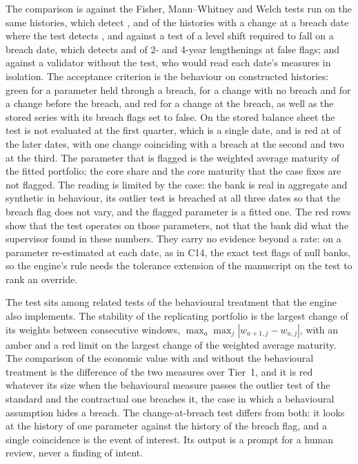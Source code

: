 The comparison is against the Fisher, Mann--Whitney and Welch tests run on the same histories, which detect \pxPpEightFisher{}, \pxPpEightMw{} and \pxPpEightWelch{} of the histories with a change at a breach date where the test detects \pxPpEightStatedAlt{}, and against a test of a level shift required to fall on a breach date, which detects \pxPpEightBreakTwo{} and \pxPpEightBreakFour{} of 2- and 4-year lengthenings at \pxPpEightBreakNull{} false flags; and against a validator without the test, who would read each date's measures in isolation. The acceptance criterion is the behaviour on constructed histories:
green for a parameter held through a breach, for a change with no breach and for a change before the breach, and red for a change at the breach, as well as the stored series with its breach flags set to false.
On the stored balance sheet the test is not evaluated at the first quarter, which is a single date, and is red at \pxEightRedDates{} of the later dates, with one change coinciding with a breach at the
second and two at the third. The parameter that is flagged is the weighted average maturity of the fitted portfolio; the core share and the core maturity that the case fixes are not flagged.
The reading is limited by the case: the bank is real in aggregate and synthetic in behaviour, its outlier test is breached at all three dates so that the breach flag does not vary, and the flagged parameter is
a fitted one. The red rows show that the test operates on those parameters, not that the bank did what the supervisor found in these numbers. They carry no evidence beyond a rate: on a parameter re-estimated at each date, as in C14, the exact test flags \pxPpEightFitNull{} of null banks, so the engine's rule needs the tolerance extension of the manuscript on the test to rank an override.

The test sits among related tests of the behavioural treatment that the engine also implements. The stability of the replicating portfolio is the largest change of its weights between consecutive windows,
$\max_{a}\max_{j}|w_{a+1,j}-w_{a,j}|$, with an amber and a red limit on the largest change of the weighted average maturity. The comparison of the economic value with and without the behavioural treatment is the difference of the
two measures over Tier~1, and it is red whatever its size when the behavioural measure passes the outlier test of the standard and the contractual one breaches it, the case in which a behavioural assumption hides a breach. The
change-at-breach test differs from both: it looks at the history of one parameter against the history of the breach flag, and a single coincidence is the event of interest. Its output is a prompt for a human review, never a
finding of intent.

